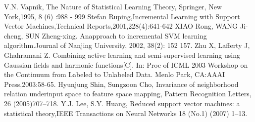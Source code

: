\documentclass[a4paper]{article}
\begin{document}
\renewcommand\refname{References}
\begin{thebibliography}{99}
    V.N. Vapnik, The Nature of Statistical Learning Theory, Springer, New York,1995, 8 (6) :988 - 999
    Stefan Ruping,Incremental Learning with Support Vector Machines,Technical Reports,2001,228(4):641-642
    XIAO Rong, WANG Ji-cheng, SUN Zheng-xing. Anapproach to incremental SVM learning algorithm.Journal of Nanjing University, 2002, 38(2): 152 157.
    Zhu X, Lafferty J, Ghahramani Z. Combining active learning and semi-supervised learning using Gaussian fields  and  harmonic  functions[C].  In:  Proc  of  ICML  2003  Workshop  on  the  Continuum  from  Labeled  to Unlabeled Data. Menlo Park, CA:AAAI Press,2003:58-65.
    Hyunjung Shin, Sungzoon Cho, Invariance of neighborhood relation underinput space to feature space mapping, Pattern Recognition Letters, 26 (2005)707–718.
    Y.J. Lee, S.Y. Huang, Reduced support vector machines: a statistical theory,IEEE Transactions on Neural Networks 18 (No.1) (2007) 1–13.
\end{thebibliography}
\end{document}
